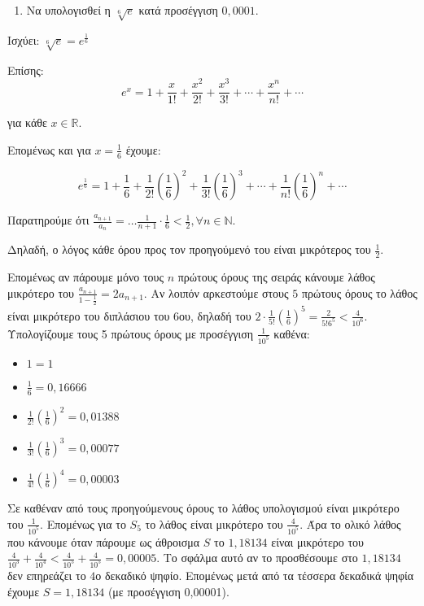 \documentclass[a4paper,12pt]{article}
\begin{document}
\vspace{1cm}



\begin{enumerate}
\item Να υπολογισθεί η $\sqrt[6]{e}$ κατά προσέγγιση $0,0001$.
\end{enumerate}


Ισχύει: $\sqrt[6]{e}=e^{\frac{1}{6}}$

Επίσης: \[e^x=1+\frac{x}{1!}+\frac{x^2}{2!}+\frac{x^3}{3!}+\cdots + \frac{x^n}{n!}+\cdots\]

για κάθε $x\in \mathbb{R}$.

Επομένως και για $x=\frac{1}{6}$ έχουμε:

\[
e^{\frac{1}{6}}=1+\frac{1}{6}+\frac{1}{2!}\left(\frac{1}{6}\right)^2+\frac{1}{3!}\left(\frac{1}{6}\right)^3+\cdots+\frac{1}{n!}\left(\frac{1}{6}\right)^n+\cdots
\]

Παρατηρούμε ότι $\frac{a_{n+1}}{a_n}=\ldots \frac{1}{n+1}\cdot \frac{1}{6}<\frac{1}{2}, \forall n\in \mathbb{N}.$

Δηλαδή, ο λόγος κάθε όρου προς τον προηγούμενό του είναι μικρότερος του $\frac{1}{2}$.

 Επομένως αν πάρουμε μόνο τους $n$ πρώτους όρους της σειράς κάνουμε λάθος μικρότερο του $\frac{a_{n+1}}{1-\frac{1}{2}}=2a_{n+1}.$ Αν λοιπόν αρκεστούμε στους $5$ πρώτους όρους το λάθος είναι μικρότερο του διπλάσιου του $6$ου, δηλαδή του $2\cdot \frac{1}{5!}\left(\frac{1}{6}\right)^5=\frac{2}{5!6^5}<\frac{4}{10^6}$. Υπολογίζουμε τους 5 πρώτους όρους με προσέγγιση $\frac{1}{10^5}$ καθένα: 

\begin{itemize}
\item $1=1$ 
\item $\frac{1}{6}=0,16666$ 
\item $\frac{1}{2!}\left(\frac{1}{6}\right)^2=0,01388$
\item $\frac{1}{3!}\left(\frac{1}{6}\right)^3=0,00077$
\item $\frac{1}{4!}\left(\frac{1}{6}\right)^4=0,00003$
\end{itemize}

Σε καθέναν από τους προηγούμενους όρους το λάθος υπολογισμού είναι μικρότερο του $\frac{1}{10^5}$. Επομένως για το $S_5$ το λάθος είναι μικρότερο του $\frac{4}{10^5}$. Άρα το ολικό λάθος που κάνουμε όταν πάρουμε ως άθροισμα $S$ το $1,18134$ είναι μικρότερο του $\frac{4}{10^3}+\frac{4}{10^4}<\frac{4}{10^5}+\frac{4}{10^5}=0,00005$. Το σφάλμα αυτό αν το προσθέσουμε στο $1,18134$ δεν επηρεάζει το $4$ο δεκαδικό ψηφίο. Επομένως μετά από τα τέσσερα δεκαδικά ψηφία έχουμε $S=1,18134$ (με προσέγγιση 0,00001).
\end{document}
